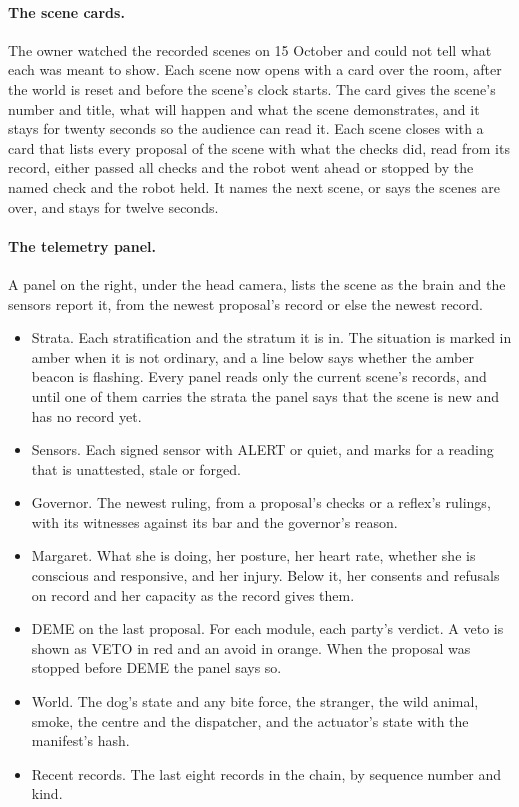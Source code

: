 \paragraph{The scene cards.}
The owner watched the recorded scenes on 15 October and could not tell what each was meant to show.
Each scene now opens with a card over the room, after the world is reset and before the scene's
clock starts. The card gives the scene's number and title, what will happen and what the scene
demonstrates, and it stays for twenty seconds so the audience can read it. Each scene closes with a
card that lists every proposal of the scene with what the checks did, read from its record, either
passed all checks and the robot went ahead or stopped by the named check and the robot held. It
names the next scene, or says the scenes are over, and stays for twelve seconds.

\paragraph{The telemetry panel.}
A panel on the right, under the head camera, lists the scene as the brain and the sensors report
it, from the newest proposal's record or else the newest record.
\begin{itemize}
\item Strata. Each stratification and the stratum it is in. The situation is marked in amber when
it is not ordinary, and a line below says whether the amber beacon is flashing. Every panel reads
only the current scene's records, and until one of them carries the strata the panel says that
the scene is new and has no record yet.
\item Sensors. Each signed sensor with ALERT or quiet, and marks for a reading that is unattested,
stale or forged.
\item Governor. The newest ruling, from a proposal's checks or a reflex's rulings, with its
witnesses against its bar and the governor's reason.
\item Margaret. What she is doing, her posture, her heart rate, whether she is conscious and
responsive, and her injury. Below it, her consents and refusals on record and her capacity as the
record gives them.
\item DEME on the last proposal. For each module, each party's verdict. A veto is shown as VETO in
red and an avoid in orange. When the proposal was stopped before DEME the panel says so.
\item World. The dog's state and any bite force, the stranger, the wild animal, smoke, the centre
and the dispatcher, and the actuator's state with the manifest's hash.
\item Recent records. The last eight records in the chain, by sequence number and kind.
\end{itemize}

